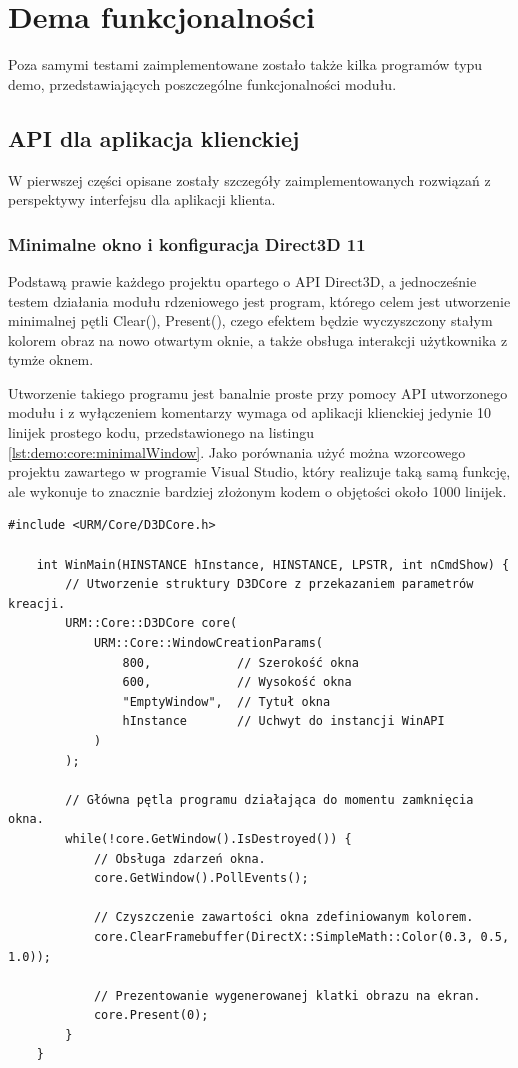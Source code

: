 \chapter{Dema funkcjonalności}
Poza samymi testami zaimplementowane zostało także kilka programów typu demo, przedstawiających poszczególne funkcjonalności modułu.

\section{API dla aplikacja klienckiej}
W pierwszej części opisane zostały szczegóły zaimplementowanych rozwiązań z perspektywy interfejsu dla aplikacji klienta. 

\subsection{Minimalne okno i konfiguracja Direct3D 11}
Podstawą prawie każdego projektu opartego o API Direct3D, a jednocześnie testem działania modułu rdzeniowego jest program, którego celem jest utworzenie minimalnej pętli Clear(), Present(), czego efektem będzie wyczyszczony stałym kolorem obraz na nowo otwartym oknie, a także obsługa interakcji użytkownika z tymże oknem.

Utworzenie takiego programu jest banalnie proste przy pomocy API utworzonego modułu i z wyłączeniem komentarzy wymaga od aplikacji klienckiej jedynie 10 linijek prostego kodu, przedstawionego na listingu \ref{lst:demo:core:minimalWindow}. Jako porównania użyć można wzorcowego projektu zawartego w programie Visual Studio, który realizuje taką samą funkcję, ale wykonuje to znacznie bardziej złożonym kodem o objętości około 1000 linijek.

\vfill

\begin{lstlisting}[caption={Pełny kod programu wykorzystującego API modułu do utworzenia minimalnego okna.}, label={lst:demo:core:minimalWindow}]
	#include <URM/Core/D3DCore.h>
	
	int WinMain(HINSTANCE hInstance, HINSTANCE, LPSTR, int nCmdShow) {
		// Utworzenie struktury D3DCore z przekazaniem parametrów kreacji. 
		URM::Core::D3DCore core(
			URM::Core::WindowCreationParams(
				800,            // Szerokość okna
				600,            // Wysokość okna
				"EmptyWindow",  // Tytuł okna
				hInstance       // Uchwyt do instancji WinAPI
			)
		);
	    
		// Główna pętla programu działająca do momentu zamknięcia okna.
		while(!core.GetWindow().IsDestroyed()) {
			// Obsługa zdarzeń okna.
			core.GetWindow().PollEvents();

			// Czyszczenie zawartości okna zdefiniowanym kolorem.
			core.ClearFramebuffer(DirectX::SimpleMath::Color(0.3, 0.5, 1.0));

			// Prezentowanie wygenerowanej klatki obrazu na ekran.
			core.Present(0);
		}
	}
\end{lstlisting}

